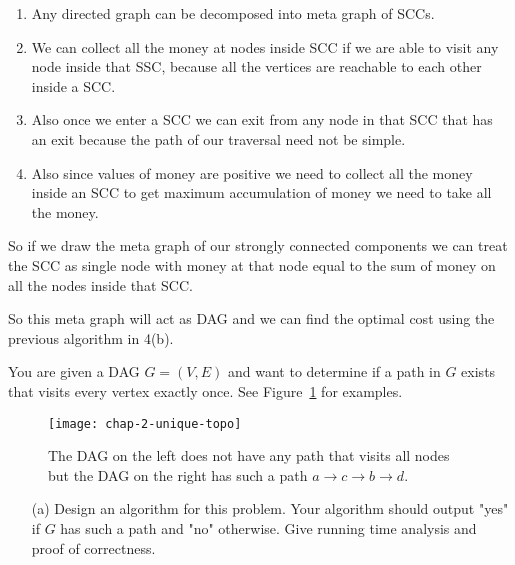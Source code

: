 \documentclass[answers]{exam}
\begin{document}
\begin{questions}
\begin{solution}
\begin{enumerate}

\item Any directed graph can be decomposed into meta graph of SCCs. 

\item We can collect all the money at nodes inside SCC if we are able to visit any node inside that SSC, because all the vertices are reachable to each other inside a SCC. 

\item Also once we enter a SCC we can exit from any node in that SCC that has an exit because the path of our traversal need not be simple.

\item Also since values of money are positive we need to collect all the money inside an SCC to get maximum accumulation of money we need to take all the money.
\end{enumerate}
So if we draw the meta graph of our strongly connected components we can treat the SCC as single node with money at that node equal to the sum of money on all the nodes inside that SCC.

So this meta graph will act as DAG and we can find the optimal cost using the previous algorithm in 4(b).

\end{solution}






\vspace{0.3in}







\question[18] You are given a DAG $G = (V, E)$ and want to determine if a path in $G$ exists that visits every vertex exactly once. See Figure~\ref{fig:chap-2-unique-topo} for examples.
\begin{figure}[H]
\centering
\texttt{[image: chap-2-unique-topo]}
\caption[Example for exercise]{The DAG on the left does not have any path that visits all nodes but the DAG on the right has such a path $a\rightarrow c \rightarrow b \rightarrow d$.}
\label{fig:chap-2-unique-topo}
\end{figure}
\begin{enumerate}
\item[(a)] Design an algorithm for this problem.
Your algorithm should output "yes" if $G$ has such a path and "no" otherwise.
Give running time analysis and proof of correctness.


\end{enumerate}
\end{questions}
\end{document}
